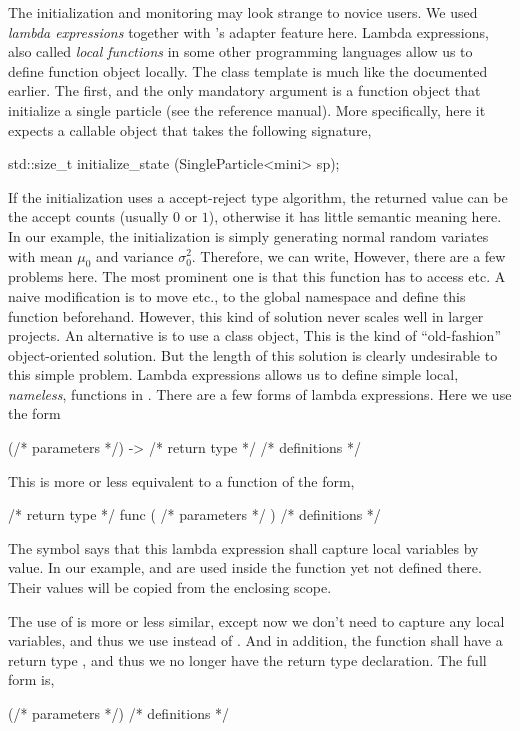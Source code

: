 The initialization and monitoring may look strange to novice \cpp users. We
used \cppoo{} \emph{lambda expressions} together with \vsmc's adapter feature
here. Lambda expressions, also called \emph{local functions} in some other
programming languages allow us to define function object locally. The
 class template is much like the
 documented earlier. The first, and the only mandatory
argument is a function object that initialize a single particle (see the
reference manual). More specifically, here it expects a callable object that
takes the following signature,
\begin{cppcode}
std::size_t initialize_state (SingleParticle<mini> sp);
\end{cppcode}
If the initialization uses a accept-reject type algorithm, the returned value
can be the accept counts (usually $0$ or $1$), otherwise it has little
semantic meaning here. In our example, the initialization is simply generating
normal random variates with mean $\mu_0$ and variance $\sigma_0^2$. Therefore,
we can write,
However, there are a few problems here. The most prominent one is that this
function has to access  etc. A naive modification is to move
 etc., to the global namespace and define this function
beforehand. However, this kind of solution never scales well in larger
projects. An alternative is to use a class object,
This is the kind of ``old-fashion'' object-oriented solution. But the length
of this solution is clearly undesirable to this simple problem. Lambda
expressions allows us to define simple local, \emph{nameless}, functions in
\cpp. There are a few forms of lambda expressions. Here we use the form
\begin{cppcode}
[=] (/* parameters */) -> /* return type */ { /* definitions */ }
\end{cppcode}
This is more or less equivalent to a function of the form,
\begin{cppcode}
/* return type */ func ( /* parameters */ ) { /* definitions */ }
\end{cppcode}
The symbol \cppinline{[=]} says that this lambda expression shall capture
local variables by value. In our example,  and 
are used inside the function yet not defined there. Their values will be
copied from the enclosing scope.

The use of  is more or less similar, except now
we don't need to capture any local variables, and thus we use \cppinline{[]}
instead of \cppinline{[=]}. And in addition, the function shall have a return
type , and thus we no longer have the return type declaration.
The full form is,
\begin{cppcode}
[] (/* parameters */) { /* definitions */ }
\end{cppcode}

